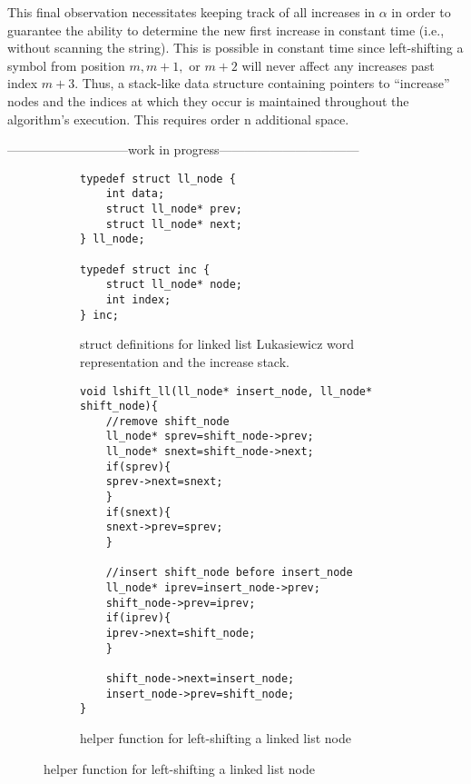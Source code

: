 This final observation necessitates keeping track of all increases in $\alpha$ in order to guarantee the ability to determine the new first increase in constant time (i.e., without scanning the string).  This is possible in constant time since left-shifting a symbol from position $m,m+1,$ or $m+2$ will never affect any increases past index $m+3$.  Thus, a stack-like data structure containing pointers to ``increase'' nodes and the indices at which they occur is maintained throughout the algorithm's execution.  This requires order n additional space.

-----------------------------work in progress---------------------------------
    
\begin{figure}[H]
    \begin{subfigure}[]{.5\textwidth}
    \begin{center}
        \begin{Verbatim}
typedef struct ll_node {
    int data;
    struct ll_node* prev;
    struct ll_node* next;
} ll_node;

typedef struct inc {
    struct ll_node* node;
    int index;
} inc;
        \end{Verbatim}
            
    \end{center}

    \caption{struct definitions for linked list Lukasiewicz word representation and the increase stack.}
    \label{fig:lukaStruct}
    \end{subfigure}
    \begin{subfigure}[]{.5\textwidth}
    \begin{center}
        \begin{Verbatim}
void lshift_ll(ll_node* insert_node, ll_node* shift_node){
    //remove shift_node
    ll_node* sprev=shift_node->prev;
    ll_node* snext=shift_node->next;
    if(sprev){
	sprev->next=snext;
    }
    if(snext){
	snext->prev=sprev;
    }

    //insert shift_node before insert_node
    ll_node* iprev=insert_node->prev;
    shift_node->prev=iprev;
    if(iprev){
	iprev->next=shift_node;
    }

    shift_node->next=insert_node;
    insert_node->prev=shift_node;
}

        \end{Verbatim}
            
    \end{center}

\caption{helper function for left-shifting a linked list node}
    \label{fig:lukaHelpers}
    \end{subfigure}

\end{figure}


